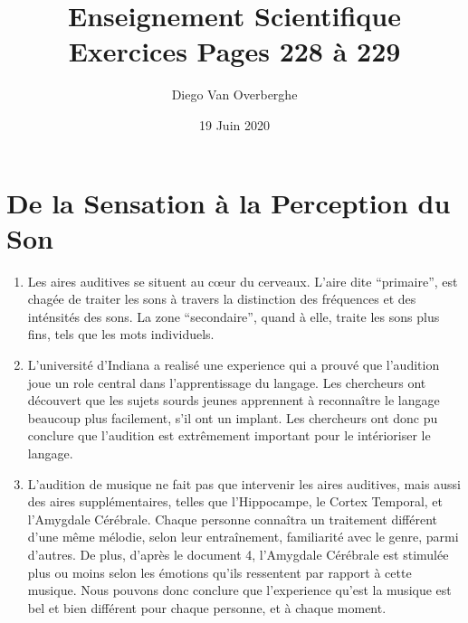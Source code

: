 \documentclass[12pt, a4paper]{article}
\begin{document}
    \title{Enseignement Scientifique \\ Exercices Pages 228 à 229}
    \author{Diego Van Overberghe}
    \date{19 Juin 2020}
    \maketitle

    \setcounter{section}{3}

    \section{De la Sensation à la Perception du Son}
    \begin{enumerate}[1.]
        \item   Les aires auditives se situent au cœur du cerveaux. L'aire dite ``primaire'', est chagée de traiter les sons à travers la distinction des fréquences et des inténsités des sons. La zone ``secondaire'', quand à elle, traite les sons plus fins, tels que les mots individuels.
        \item   L'université d'Indiana a realisé une experience qui a prouvé que l'audition joue un role central dans l'apprentissage du langage. Les chercheurs ont découvert que les sujets sourds jeunes apprennent à reconnaître le langage beaucoup plus facilement, s'il ont un implant. Les chercheurs ont donc pu conclure que l'audition est extrêmement important pour le intérioriser le langage.
        \item   L'audition de musique ne fait pas que intervenir les aires auditives, mais aussi des aires supplémentaires, telles que l'Hippocampe, le Cortex Temporal, et l'Amygdale Cérébrale. Chaque personne connaîtra un traitement différent d'une même mélodie, selon leur entraînement, familiarité avec le genre, parmi d'autres. De plus, d'après le document {\Large\textcircled{\small{4}}}, l'Amygdale Cérébrale est stimulée plus ou moins selon les émotions qu'ils ressentent par rapport à cette musique. Nous pouvons donc conclure que l'experience qu'est la musique est bel et bien différent pour chaque personne, et à chaque moment. 
    \end{enumerate}
\end{document}
